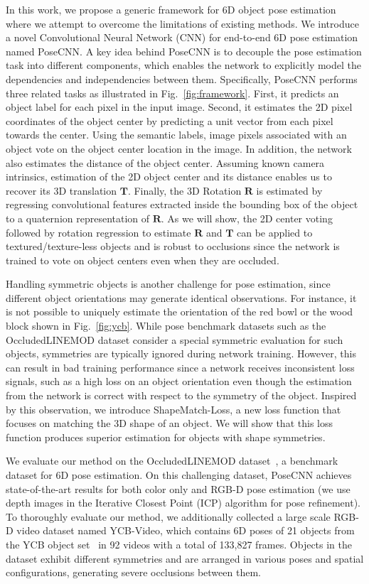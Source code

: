 \documentclass[conference]{IEEEtran}
\begin{document}
In this work, we propose a generic framework for 6D object pose estimation where we attempt to overcome the limitations of existing methods. We introduce a novel Convolutional Neural Network (CNN) for end-to-end 6D pose estimation named PoseCNN. A key idea behind PoseCNN is to decouple the pose estimation task into different components, which enables the network to explicitly model the dependencies and independencies between them. Specifically, PoseCNN performs three related tasks as illustrated in Fig.~\ref{fig:framework}. First, it predicts an object label for each pixel in the input image. Second, it estimates the 2D pixel coordinates of the object center by predicting a unit vector from each pixel towards the center. Using the semantic labels, image pixels associated with an object vote on the object center location in the image. In addition, the network also estimates the distance of the object center. Assuming known camera intrinsics, estimation of the 2D object center and its distance enables us to recover its 3D translation $\mathbf{T}$. Finally, the 3D Rotation $\mathbf{R}$ is estimated by regressing convolutional features extracted inside the bounding box of the object to a quaternion representation of $\mathbf{R}$. As we will show, the 2D center voting followed by rotation regression to estimate $\mathbf{R}$ and $\mathbf{T}$ can be applied to textured/texture-less objects and is robust to occlusions since the network is trained to vote on object centers even when they are occluded.

Handling symmetric objects is another challenge for pose estimation, since different object orientations may generate identical observations. For instance, it is not possible to uniquely estimate the orientation of the red bowl or the wood block shown in Fig.~\ref{fig:ycb}. While pose benchmark datasets such as the OccludedLINEMOD dataset \cite{krull2015learning} consider a special symmetric evaluation for such objects, symmetries are typically ignored during network training. However, this can result in bad training performance since a network receives inconsistent loss signals, such as a high loss on an object orientation even though the estimation from the network is correct with respect to the symmetry of the object. Inspired by this observation, we introduce ShapeMatch-Loss, a new loss function that focuses on matching the 3D shape of an object. We will show that this loss function produces superior estimation for objects with shape symmetries.

We evaluate our method on the OccludedLINEMOD dataset~\cite{krull2015learning}, a benchmark dataset for 6D pose estimation.  On this challenging dataset, PoseCNN achieves state-of-the-art results for both color only  and RGB-D pose estimation (we use depth images in the Iterative Closest Point (ICP) algorithm for pose refinement). To thoroughly evaluate our method, we additionally collected a large scale RGB-D video dataset named YCB-Video, which contains 6D poses of 21 objects from the YCB object set~\cite{calli2015ycb} in 92 videos with a total of 133,827 frames. Objects in the dataset exhibit different symmetries and are arranged in various poses and spatial configurations, generating severe occlusions between them.
\end{document}
